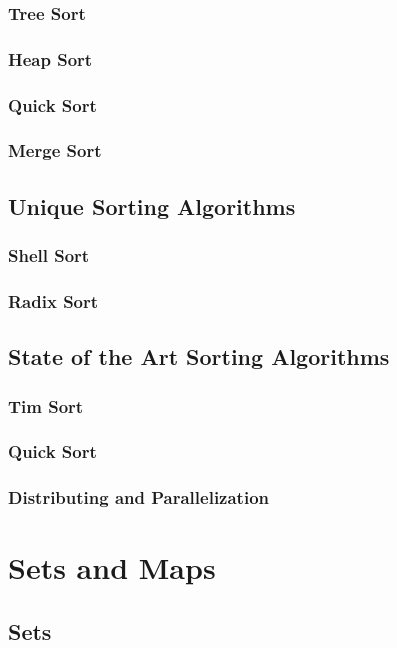 \documentclass[10pt,a4paper]{book}
\begin{document}
\subsection{Tree Sort}
\subsection{Heap Sort}
\subsection{Quick Sort}
\subsection{Merge Sort}



\section{Unique Sorting Algorithms}


\subsection{Shell Sort}

\subsection{Radix Sort}

\section{State of the Art Sorting Algorithms}

\subsection{Tim Sort}
\subsection{Quick Sort}
\subsection{Distributing and Parallelization}


\chapter{Sets and Maps}
\section{Sets}
\end{document}
